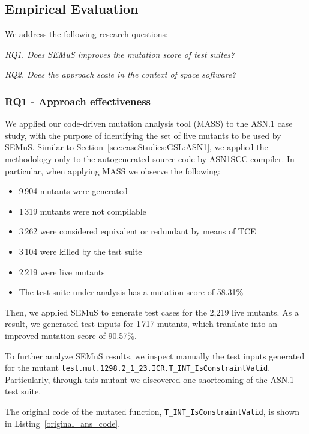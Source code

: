 
\subsection{Empirical Evaluation}

We address the following research questions:

\emph{RQ1. Does SEMuS improves the mutation score of test suites?}

\emph{RQ2. Does the approach scale in the context of space software?}

\subsubsection{RQ1 - Approach effectiveness}

We applied our code-driven mutation analysis tool (MASS) to the ASN.1 case study, with the purpose of identifying the set of live mutants to be used by SEMuS. Similar to Section~\ref{sec:caseStudies:GSL:ASN1}, we applied the methodology only to the autogenerated source code by ASN1SCC compiler. In particular, when applying MASS we observe the following:

\begin{itemize}
	\item 9\,904 mutants were generated
	\item 1\,319 mutants were not compilable
	\item 3\,262 were considered equivalent or redundant by means of TCE
	\item 3\,104 were killed by the test suite
	\item 2\,219 were live mutants
	\item The test suite under analysis has a mutation score of 58.31\%
\end{itemize}

Then, we applied SEMuS to generate test cases for the 2,219 live mutants. As a result, we generated test inputs for 1\,717 mutants, which translate into an improved mutation score of 90.57\%.

To further analyze SEMuS results, we inspect manually the test inputs generated for the mutant \texttt{test.mut.1298.2\_1\_23.ICR.T\_INT\_IsConstraintValid}. Particularly, through this mutant we discovered one shortcoming of the ASN.1 test suite.

The original code of the mutated function, \texttt{T\_INT\_IsConstraintValid}, is shown in Listing~\ref{original_ans_code}.

